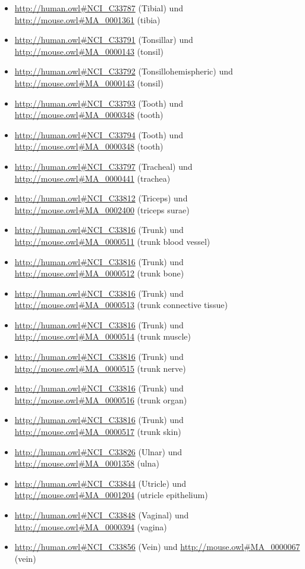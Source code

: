 \begin{itemize}
	\item \url{http://human.owl#NCI_C33787} (Tibial\textunderscoreVein) und \url{http://mouse.owl#MA_0001361} (tibia)
	\item \url{http://human.owl#NCI_C33791} (Tonsillar\textunderscoreCrypt) und \url{http://mouse.owl#MA_0000143} (tonsil)
	\item \url{http://human.owl#NCI_C33792} (Tonsillohemispheric\textunderscoreArtery) und \url{http://mouse.owl#MA_0000143} (tonsil)
	\item \url{http://human.owl#NCI_C33793} (Tooth\textunderscoreCell) und \url{http://mouse.owl#MA_0000348} (tooth)
	\item \url{http://human.owl#NCI_C33794} (Tooth\textunderscoreTissue) und \url{http://mouse.owl#MA_0000348} (tooth)
	\item \url{http://human.owl#NCI_C33797} (Tracheal\textunderscoreEpithelium) und \url{http://mouse.owl#MA_0000441} (trachea)
	\item \url{http://human.owl#NCI_C33812} (Triceps) und \url{http://mouse.owl#MA_0002400} (triceps surae)
	\item \url{http://human.owl#NCI_C33816} (Trunk) und \url{http://mouse.owl#MA_0000511} (trunk blood vessel)
	\item \url{http://human.owl#NCI_C33816} (Trunk) und \url{http://mouse.owl#MA_0000512} (trunk bone)
	\item \url{http://human.owl#NCI_C33816} (Trunk) und \url{http://mouse.owl#MA_0000513} (trunk connective tissue)
	\item \url{http://human.owl#NCI_C33816} (Trunk) und \url{http://mouse.owl#MA_0000514} (trunk muscle)
	\item \url{http://human.owl#NCI_C33816} (Trunk) und \url{http://mouse.owl#MA_0000515} (trunk nerve)
	\item \url{http://human.owl#NCI_C33816} (Trunk) und \url{http://mouse.owl#MA_0000516} (trunk organ)
	\item \url{http://human.owl#NCI_C33816} (Trunk) und \url{http://mouse.owl#MA_0000517} (trunk skin)
	\item \url{http://human.owl#NCI_C33826} (Ulnar\textunderscoreArtery\textunderscoreBranch) und \url{http://mouse.owl#MA_0001358} (ulna)
	\item \url{http://human.owl#NCI_C33844} (Utricle) und \url{http://mouse.owl#MA_0001204} (utricle epithelium)
	\item \url{http://human.owl#NCI_C33848} (Vaginal\textunderscoreFornix) und \url{http://mouse.owl#MA_0000394} (vagina)
	\item \url{http://human.owl#NCI_C33856} (Vein\textunderscoreof\textunderscorethe\textunderscoreHead\textunderscoreor\textunderscoreNeck) und \url{http://mouse.owl#MA_0000067} (vein)

\end{itemize}

